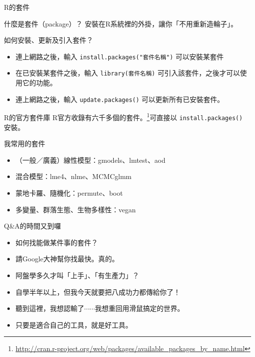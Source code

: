 \documentclass[12pt, aspectratio=43]{beamer}
\let\oldfootnote\footnote
\renewcommand\footnote[1]{\hspace{-0.3em}\oldfootnote{\ignorespaces#1}\hspace{0.3em}}
\begin{document}
\begin{frame}[fragile]{R的套件}
\begin{block}{什麼是套件（package）？}
安裝在R系統裡的外掛，讓你「不用重新造輪子」。
\end{block}

\begin{block}{如何安裝、更新及引入套件？}
\begin{itemize}
\item 連上網路之後，輸入 \verb+install.packages("套件名稱")+ 可以安裝某套件
\item 在已安裝某套件之後，輸入 \verb+library(套件名稱)+ 可引入該套件，之後才可以使用它的功能。
\item 連上網路之後，輸入 \verb+update.packages()+ 可以更新所有已安裝套件。
\end{itemize}
\end{block}

\end{frame}

\begin{frame}[fragile]{R的官方套件庫}
R官方收錄有六千多個的套件。\footnote{\url{http://cran.r-project.org/web/packages/available_packages_by_name.html}}可直接以 \verb+install.packages()+ 安裝。
\begin{block}{我常用的套件}
\begin{itemize}
\item （一般／廣義）線性模型：gmodels、lmtest、aod
\item 混合模型：lme4、nlme、MCMCglmm
\item 蒙地卡羅、隨機化：permute、boot
\item 多變量、群落生態、生物多樣性：vegan
\end{itemize}
\end{block}
\end{frame}


\begin{frame}[fragile]{Q\&A的時間又到囉}
\begin{itemize}
\item[Q] 如何找能做某件事的套件？
\item[A] 請Google大神幫你找最快。真的。

\item[Q] 阿盤學多久才叫「上手」、「有生產力」？
\item[A] 自學半年以上，但我今天就要把八成功力都傳給你了！
\item[Q] 聽到這裡，我想認輸了$\cdots\cdots$我想重回用滑鼠搞定的世界。
\item[A] 只要是適合自己的工具，就是好工具。
\end{itemize}
\end{frame}
\end{document}
